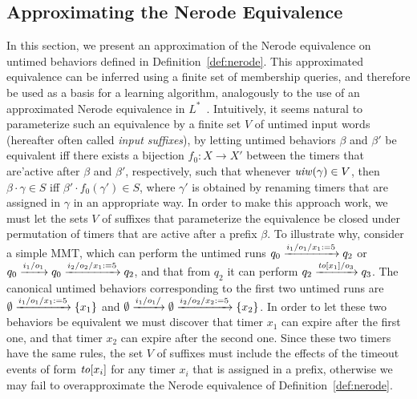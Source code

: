 \subsection{Approximating the Nerode Equivalence}
\label{sec:approx}

In this section, we present an approximation of the Nerode equivalence on
untimed behaviors
defined in Definition~\ref{def:nerode}. This
approximated equivalence can be inferred using a finite set of membership
queries, and therefore be used as a basis for a learning algorithm,
analogously to the use of an approximated Nerode equivalence in
$L^*$~\cite{Ang87}.
Intuitively, it seems natural to parameterize such an equivalence by
a finite set $V$ of untimed input words (hereafter often
called {\em input suffixes}), by letting
untimed behaviors $\beta$ and $\beta'$ be equivalent
iff there exists a bijection $f_0 : X \to X'$ between the timers that are'active after $\beta$ and $\beta'$, respectively, such that whenever
$\mathit{uiw}(\gamma) \in V$, then
$\beta\cdot\gamma \in S$ iff 
$\beta'\cdot f_0(\gamma') \in S$, where $\gamma'$ is obtained by
renaming timers that are assigned in $\gamma$ in an appropriate way.
In order to make this approach work, we must let the sets $V$ of suffixes that
parameterize the equivalence be
closed under permutation of timers that are active after a prefix $\beta$.
To illustrate why, consider a simple MMT, which can perform the untimed runs
\(
q_0 \xrightarrow{i_1/o_1/x_1:= 5} q_2
\)
or
\(
q_0 \xrightarrow{i_1/o_1} q_0 \xrightarrow{i_2/o_2/x_1:= 5} q_2
\),
and that from $q_2$ it can perform
\(
q_2 \xrightarrow{\mathit{to}[x_1]/o_3} q_3
\).
The canonical untimed behaviors corresponding to the first two
untimed runs are
\(
\emptyset \xrightarrow{i_1/o_1/x_1:= 5} \lbrace x_1\rbrace
\)
and
\(
\emptyset \xrightarrow{i_1/o_1/} \emptyset \xrightarrow{i_2/o_2/x_2:= 5} \lbrace x_2\rbrace
\).
In order to let these two behaviors be equivalent we must discover that
timer $x_1$ can expire after the first one, and that
timer $x_2$ can expire after the second one. Since these two timers
have the same rules, the set $V$ of suffixes must
include the effects of the timeout events of form $\mathit{to}[x_i]$ for any
timer $x_i$ that is assigned in a prefix, otherwise we
may fail to overapproximate the Nerode equivalence of Definition~\ref{def:nerode}.

